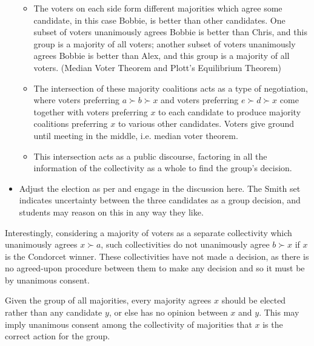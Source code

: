 \begin{itemize}
\begin{itemize}
        \item The voters on each side form different majorities which agree some candidate, in this case Bobbie, is better than other candidates.  One subset of voters unanimously agrees Bobbie is better than Chris, and this group is a majority of all voters; another subset of voters unanimously agrees Bobbie is better than Alex, and this group is a majority of all voters. (Median Voter Theorem and Plott's Equilibrium Theorem)

        \item The intersection of these majority coalitions acts as a type of negotiation, where voters preferring $a\succ b\succ x$ and voters preferring $e\succ d\succ x$ come together with voters preferring $x$ to each candidate to produce majority coalitions preferring $x$ to various other candidates.  Voters give ground until meeting in the middle, i.e. median voter theorem.

        \item This intersection acts as a public discourse, factoring in all the information of the collectivity as a whole to find the group's decision.
    \end{itemize}

    \item Adjust the election as per  and engage in the discussion here.  The Smith set indicates uncertainty between the three candidates as a group decision, and students may reason on this in any way they like.

\end{itemize}

\begin{boxcomment}
    Interestingly, considering a majority of voters as a separate collectivity which unanimously agrees $x\succ a$, such collectivities do not unanimously agree $b\succ x$ if $x$ is the Condorcet winner.  These collectivities have not made a decision, as there is no agreed-upon procedure between them to make any decision and so it must be by unanimous consent.

    Given the group of all majorities, every majority agrees $x$ should be elected rather than any candidate $y$, or else has no opinion between $x$ and $y$.  This may imply unanimous consent among the collectivity of majorities that $x$ is the correct action for the group.
\end{boxcomment}

